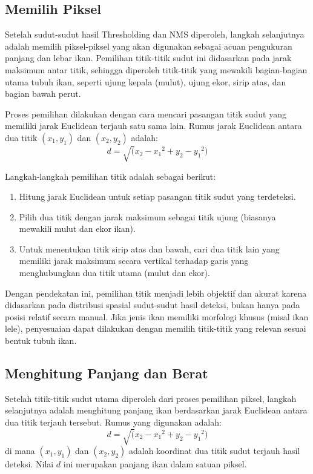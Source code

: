 \subsection{Memilih Piksel}
    Setelah sudut-sudut hasil Thresholding dan NMS diperoleh, langkah selanjutnya adalah memilih piksel-piksel yang akan digunakan sebagai acuan pengukuran panjang dan lebar ikan. Pemilihan titik-titik sudut ini didasarkan pada jarak maksimum antar titik, sehingga diperoleh titik-titik yang mewakili bagian-bagian utama tubuh ikan, seperti ujung kepala (mulut), ujung ekor, sirip atas, dan bagian bawah perut.

    Proses pemilihan dilakukan dengan cara mencari pasangan titik sudut yang memiliki jarak Euclidean terjauh satu sama lain. Rumus jarak Euclidean antara dua titik \((x_1, y_1)\) dan \((x_2, y_2)\) adalah:
\begin{equation}
    d = \sqrt({x_2 - x_1}^2 + {y_2 - y_1}^2)
\end{equation}

    Langkah-langkah pemilihan titik adalah sebagai berikut:
\begin{enumerate}
    \item Hitung jarak Euclidean untuk setiap pasangan titik sudut yang terdeteksi.
    \item Pilih dua titik dengan jarak maksimum sebagai titik ujung (biasanya mewakili mulut dan ekor ikan).
    \item Untuk menentukan titik sirip atas dan bawah, cari dua titik lain yang memiliki jarak maksimum secara vertikal terhadap garis yang menghubungkan dua titik utama (mulut dan ekor).
\end{enumerate}

    Dengan pendekatan ini, pemilihan titik menjadi lebih objektif dan akurat karena didasarkan pada distribusi spasial sudut-sudut hasil deteksi, bukan hanya pada posisi relatif secara manual. Jika jenis ikan memiliki morfologi khusus (misal ikan lele), penyesuaian dapat dilakukan dengan memilih titik-titik yang relevan sesuai bentuk tubuh ikan.
\subsection{Menghitung Panjang dan Berat}
    Setelah titik-titik sudut utama diperoleh dari proses pemilihan piksel, langkah selanjutnya adalah menghitung panjang ikan berdasarkan jarak Euclidean antara dua titik terjauh tersebut. Rumus yang digunakan adalah:
\begin{equation}
    d = \sqrt({x_2 - x_1}^2 + {y_2 - y_1}^2)
\end{equation}
    di mana \((x_1, y_1)\) dan \((x_2, y_2)\) adalah koordinat dua titik sudut terjauh hasil deteksi. Nilai \(d\) ini merupakan panjang ikan dalam satuan piksel.


